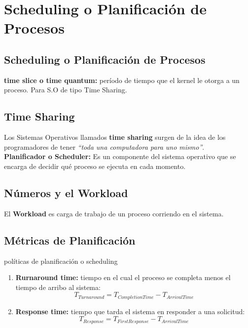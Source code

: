 \documentclass[../main.tex]{subfiles}
\begin{document}
\section{Scheduling o Planificación de Procesos}
    \subsection{Scheduling o Planificación de Procesos}
        \textbf{time slice o time quantum:} período de tiempo que el kernel le otorga a un proceso. Para S.O de tipo Time Sharing.

    \subsection{Time Sharing}
        Los Sistemas Operativos llamados \textbf{time sharing} surgen de la idea de los programadores de tener \textit{“toda una computadora para uno mismo”}.\\
        
        \textbf{Planificador o Scheduler:} Es un componente del sistema operativo que se encarga de decidir qué proceso se ejecuta en cada momento.

    \subsection{Números y el Workload}
        El \textbf{Workload} es carga de trabajo de un proceso corriendo en el sistema.

    \subsection{Métricas de Planificación}
        políticas de planificación o scheduling

        \begin{enumerate}
            \item \textbf{Rurnaround time:} tiempo en el cual el proceso se completa menos el tiempo de arribo al sistema:
                \begin{equation}
                    T_{Turnaround} = T_{Completion Time} - T_{Arrival Time}
                \end{equation}

            \item \textbf{Response time:} tiempo que tarda el sistema en responder a una solicitud:
                \begin{equation}
                    T_{Response} = T_{First Response} - T_{Arrival Time}
                \end{equation}
        \end{enumerate}
    
\end{document}
